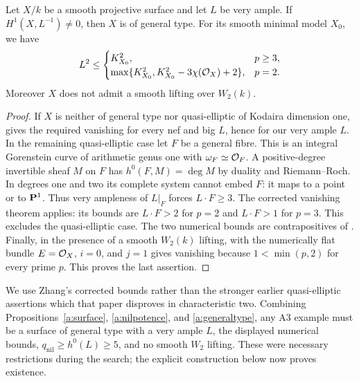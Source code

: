 \begin{proposition}
\label{a:generaltype}
Let $X/k$ be a smooth projective surface and let $L$ be very ample.
If $H^1(X,L^{-1})\ne0$, then $X$ is of general type. For its
smooth minimal model $X_0$, we have
\[
 L^2\leq
 \begin{cases}
 K_{X_0}^2,&p\geq3,\\
 \max\{K_{X_0}^2,K_{X_0}^2-3\chi(\mathcal O_X)+2\},&p=2.
 \end{cases}
\]
Moreover $X$ does not admit a smooth lifting over $W_2(k)$.
\end{proposition}
\begin{proof}
If $X$ is neither of general type nor quasi-elliptic of Kodaira
dimension one, \cite[Theorem 1.6(1), pp.~191--192]{Terakawa1999}
gives the required vanishing for every nef and big $L$, hence for
our very ample $L$. In the remaining quasi-elliptic case let $F$
be a general fibre. This is an integral Gorenstein curve of arithmetic
genus one with $\omega_F\simeq\mathcal O_F$. A positive-degree invertible
sheaf $M$ on $F$ has $h^0(F,M)=\deg M$ by duality and Riemann--Roch.
In degrees one and two its complete system cannot embed $F$:
it maps to a point or to $\mathbf P^1$. Thus very ampleness of $L|_F$
forces $L\cdot F\geq3$. The corrected vanishing theorem
\cite[Theorem 3.1, pp.~4--5]{Zhang2022} applies: its bounds are
$L\cdot F>2$ for $p=2$ and $L\cdot F>1$ for $p=3$.
This excludes the quasi-elliptic case. The two numerical bounds
are contrapositives of \cite[Theorem 1.6(2)--(3)]{Terakawa1999}.
Finally, in the presence of a smooth $W_2(k)$ lifting,
\cite[section 11, Corollary 11.2]{Langer2011} with the numerically
flat bundle $E=\mathcal O_X$, $i=0$, and $j=1$ gives vanishing because
$1<\min(p,2)$ for every prime $p$. This proves the last assertion.
\end{proof}
We use Zhang's corrected bounds rather than the stronger earlier
quasi-elliptic assertions which that paper disproves in characteristic two.
Combining Propositions~\ref{a:surface}, \ref{a:nilpotence}, and
\ref{a:generaltype}, any A3 example must be a surface
of general type with a very ample $L$, the displayed numerical bounds,
$q_{\mathrm{nil}}\geq h^0(L)\geq5$, and no smooth $W_2$ lifting.
These were necessary restrictions during the search; the explicit
construction below now proves existence.


